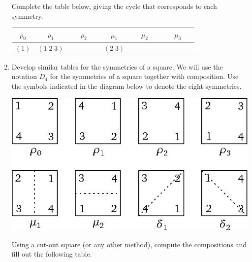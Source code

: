 \begin{enumerate}
Complete the table below, giving the cycle that corresponds to each symmetry.
    \begin{center}
   \renewcommand{\arraystretch}{1.7}
    \begin{tabular}{|c|c|c|c|c|c|} \hline
         $\rho_0$ & $\rho_1$ & $\rho_2$ & $\mu_1$ & $\mu_2$ & $\mu_3$ \\ \hline
         $(1)$ & $(1\; 2\; 3)$ & $\phantom{(1\; 2\; 3)}$ & $(2\; 3)$ & $\phantom{(1\; 2\; 3)}$ & $\phantom{(1\; 2\; 3)}$ \\ \hline
    \end{tabular}
    \end{center}

\clearpage

    \item Develop similar tables for the symmetries of a square. We will use the notation $D_4$ for the symmetries of a square together with composition. Use the symbols indicated in the diagram below to denote the eight symmetries.
    \begin{center}
        \includegraphics{wssquares.eps}
    \end{center}

    Using a cut-out square (or any other method), compute the compositions and fill out the following table.


\end{enumerate}
